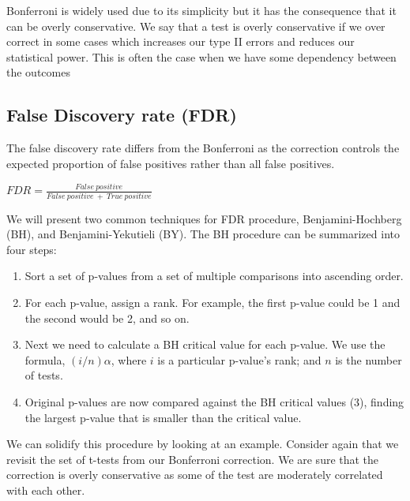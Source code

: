 \documentclass[]{book}
\providecommand{\tightlist}{%
  \setlength{\itemsep}{0pt}\setlength{\parskip}{0pt}}
\begin{document}
Bonferroni is widely used due to its simplicity but it has the consequence that it can be overly conservative. We say that a test is overly conservative if we over correct in some cases which increases our type II errors and reduces our statistical power. This is often the case when we have some dependency between the outcomes

\hypertarget{false-discovery-rate-fdr}{%
\subsection{False Discovery rate (FDR)}\label{false-discovery-rate-fdr}}

The false discovery rate differs from the Bonferroni as the correction controls the expected proportion of false positives rather than all false positives.

\(FDR = \frac{False\ positive}{False\ positive\ +\ True\ positive}\)

We will present two common techniques for FDR procedure, Benjamini-Hochberg (BH), and Benjamini-Yekutieli (BY). The BH procedure can be summarized into four steps:

\begin{enumerate}
\def\labelenumi{\arabic{enumi}.}
\tightlist
\item
  Sort a set of p-values from a set of multiple comparisons into ascending order.
\item
  For each p-value, assign a rank. For example, the first p-value could be 1 and the second would be 2, and so on.
\item
  Next we need to calculate a BH critical value for each p-value. We use the formula, \((i/n)\alpha\), where \(i\) is a particular p-value's rank; and \(n\) is the number of tests.
\item
  Original p-values are now compared against the BH critical values (3), finding the largest p-value that is smaller than the critical value.
\end{enumerate}

We can solidify this procedure by looking at an example. Consider again that we revisit the set of t-tests from our Bonferroni correction. We are sure that the correction is overly conservative as some of the test are moderately correlated with each other.
\end{document}
